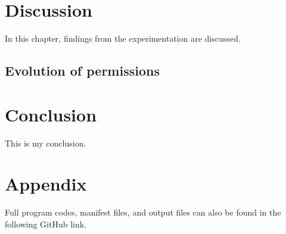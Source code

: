 \documentclass[
  a4paper,  %
  twoside,  %
  bibliography=totoc,
  headsepline,
  cleardoublepage=empty,
  parskip=half,
  draft=false,
  open=any
]{scrbook}
\begin{document}
\chapter{Discussion}
\label{cha:discussion}
In this chapter, findings from the experimentation are discussed.

\section{Evolution of permissions}


\chapter{Conclusion}
\label{cha:conclusion}


This is my conclusion. 

\printbibliography

\appendix
\chapter{Appendix}
Full program codes, manifest files, and output files can also be found in the following GitHub link.

%

%

%

%
\end{document}
